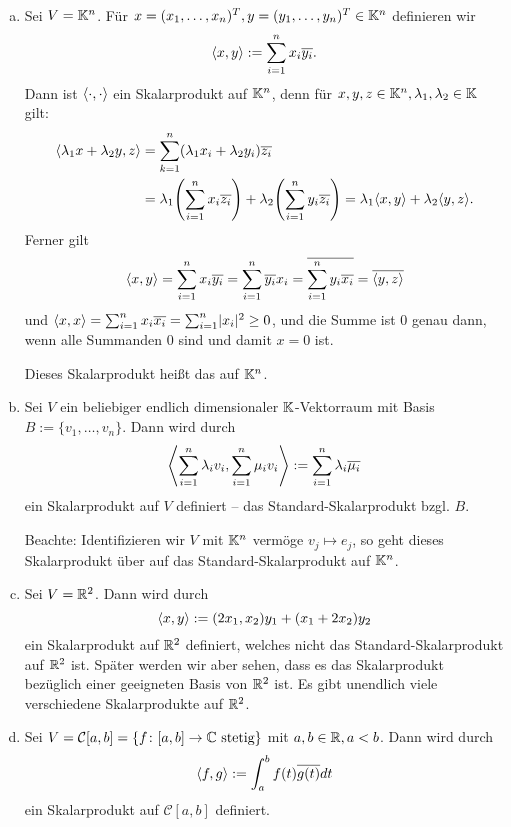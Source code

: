 \begin{beispiel}
	\label{bsp:3.3}
	\mbox{} \\[-1.4cm]
	\begin{enumerate}[(a)]
		\item Sei $V = \mathbb{K}^n$.
		Für $x = (x_1,\dots,x_n)^T, y = (y_1,\dots,y_n)^T \in \mathbb{K}^n$ definieren wir
		\[
			\left\langle x,y\right\rangle := \sum_{i=1}^{n} x_i \overline{y_i}.
		\]
		Dann ist $\langle\cdot,\cdot\rangle$ ein Skalarprodukt auf $\mathbb{K}^n$, denn für $x,y,z \in \mathbb{K}^n, \lambda_1,\lambda_2 \in \mathbb{K}$ gilt:
		\begin{align*}
			\sk{\lambda_1 x + \lambda_2 y,z} &= \sum_{k=1}^{n} (\lambda_1 x_i + \lambda_2 y_i)\ol{z_i} \\
			&= \lambda_1 \enb{\sum_{i=1}^n x_i \ol{z_i}} + \lambda_2 \enb{\sum_{i=1}^{n} y_i \ol{z_i}} = \lambda_1 \sk{x,y} + \lambda_2 \sk{y,z}.
		\end{align*}
		Ferner gilt
		\[
			\left\langle x,y\right\rangle = \sum_{i=1}^{n} x_i \overline{y_i} = \sum_{i=1}^{n} \overline{y_i}x_i = \overline{\sum_{i=1}^{n} y_i \overline{x_i}} = \overline{\left\langle y,z\right\rangle}
		\]
		und $\left\langle x,x\right\rangle = \sum_{i=1}^{n} x_i \overline{x_i} = \sum_{i=1}^{n} \lvert x_i\rvert^2 \geq 0$, und die Summe ist $0$ genau dann, wenn alle Summanden 0 sind und damit $x = 0$ ist.
		
		Dieses Skalarprodukt heißt das  auf $\mathbb{K}^n$.
		\item Sei $V$ ein beliebiger endlich dimensionaler $\mathbb{K}$-Vektorraum mit Basis $B := \{v_1,\dots,v_n\}$.
		Dann wird durch
		\[
			\left\langle\sum_{i=1}^{n} \lambda_i v_i, \sum_{i=1}^{n} \mu_i v_i\right\rangle := \sum_{i=1}^n \lambda_i \overline{\mu_i}
		\]
		ein Skalarprodukt auf $V$ definiert -- das Standard-Skalarprodukt bzgl. $B$.
		
		Beachte: Identifizieren wir $V$ mit $\mathbb{K}^n$ vermöge $v_j \mapsto e_j$, so geht dieses Skalarprodukt über auf das Standard-Skalarprodukt auf $\mathbb{K}^n$.
		\item Sei $V = \mathbb{R}^2$.
		Dann wird durch
		\[
			\left\langle x,y\right\rangle := (2x_1,x_2)y_1 + (x_1+2x_2)y_2
		\]
		ein Skalarprodukt auf $\mathbb{R}^2$ definiert, welches nicht das Standard-Skalarprodukt auf $\mathbb{R}^2$ ist.
		Später werden wir aber sehen, dass es das Skalarprodukt bezüglich einer geeigneten Basis von $\mathbb{R}^2$ ist.
		Es gibt unendlich viele verschiedene Skalarprodukte auf $\mathbb{R}^2$.
		\item Sei $V = \mathcal{C}[a,b] = \{f \colon [a,b] \rightarrow \mathbb{C} \text{ stetig}\}$ mit $a,b \in \mathbb{R}, a < b$.
		Dann wird durch
		\[
			\left\langle f,g\right\rangle := \int_{a}^{b} f(t) \overline{g(t)} dt
		\]
		ein Skalarprodukt auf $\mathcal{C}[a,b]$ definiert.
	\end{enumerate}
\end{beispiel}

